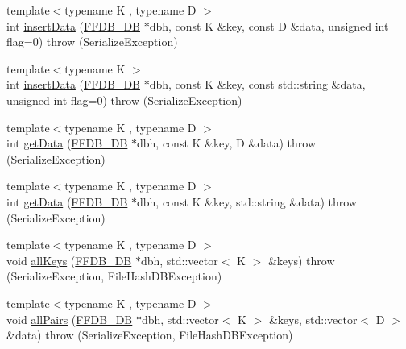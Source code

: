 \begin{DoxyCompactItemize}
\item 
{\footnotesize template$<$typename K , typename D $>$ }\\int \mbox{\hyperlink{namespaceFILEDB_a63f788f0f11a571f254ac8cfa8d19132}{insert\+Data}} (\mbox{\hyperlink{other__libs_2filedb_2filehash_2ffdb__db_8h_a0b27b956926453a7a8141ea8e10f0df8}{F\+F\+D\+B\+\_\+\+DB}} $\ast$dbh, const K \&key, const D \&data, unsigned int flag=0)  throw (\+Serialize\+Exception)
\item 
{\footnotesize template$<$typename K $>$ }\\int \mbox{\hyperlink{namespaceFILEDB_aeadc0ee930c4a7b2ddae220799008bd6}{insert\+Data}} (\mbox{\hyperlink{other__libs_2filedb_2filehash_2ffdb__db_8h_a0b27b956926453a7a8141ea8e10f0df8}{F\+F\+D\+B\+\_\+\+DB}} $\ast$dbh, const K \&key, const std\+::string \&data, unsigned int flag=0)  throw (\+Serialize\+Exception)
\item 
{\footnotesize template$<$typename K , typename D $>$ }\\int \mbox{\hyperlink{namespaceFILEDB_a0d18d10ad6d490786b6fe538fbd45dc3}{get\+Data}} (\mbox{\hyperlink{other__libs_2filedb_2filehash_2ffdb__db_8h_a0b27b956926453a7a8141ea8e10f0df8}{F\+F\+D\+B\+\_\+\+DB}} $\ast$dbh, const K \&key, D \&data)  throw (\+Serialize\+Exception)
\item 
{\footnotesize template$<$typename K , typename D $>$ }\\int \mbox{\hyperlink{namespaceFILEDB_a7381d9e3dd76dc6eb741797e16c3052c}{get\+Data}} (\mbox{\hyperlink{other__libs_2filedb_2filehash_2ffdb__db_8h_a0b27b956926453a7a8141ea8e10f0df8}{F\+F\+D\+B\+\_\+\+DB}} $\ast$dbh, const K \&key, std\+::string \&data)  throw (\+Serialize\+Exception)
\item 
{\footnotesize template$<$typename K , typename D $>$ }\\void \mbox{\hyperlink{namespaceFILEDB_a3d87ecce7111516944b8b8e532aad4ea}{all\+Keys}} (\mbox{\hyperlink{other__libs_2filedb_2filehash_2ffdb__db_8h_a0b27b956926453a7a8141ea8e10f0df8}{F\+F\+D\+B\+\_\+\+DB}} $\ast$dbh, std\+::vector$<$ K $>$ \&keys)  throw (\+Serialize\+Exception, File\+Hash\+D\+B\+Exception)
\item 
{\footnotesize template$<$typename K , typename D $>$ }\\void \mbox{\hyperlink{namespaceFILEDB_a94222bc861d65f1c5f139529a5643cd4}{all\+Pairs}} (\mbox{\hyperlink{other__libs_2filedb_2filehash_2ffdb__db_8h_a0b27b956926453a7a8141ea8e10f0df8}{F\+F\+D\+B\+\_\+\+DB}} $\ast$dbh, std\+::vector$<$ K $>$ \&keys, std\+::vector$<$ D $>$ \&data)  throw (\+Serialize\+Exception, File\+Hash\+D\+B\+Exception)

\end{DoxyCompactItemize}
